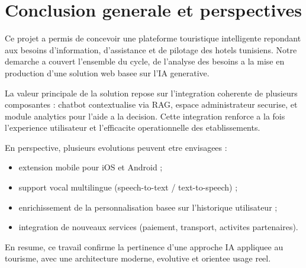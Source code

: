 \chapter*{Conclusion generale et perspectives}

Ce projet a permis de concevoir une plateforme touristique intelligente repondant aux besoins d'information, d'assistance et de pilotage des hotels tunisiens. Notre demarche a couvert l'ensemble du cycle, de l'analyse des besoins a la mise en production d'une solution web basee sur l'IA generative.

La valeur principale de la solution repose sur l'integration coherente de plusieurs composantes : chatbot contextualise via RAG, espace administrateur securise, et module analytics pour l'aide a la decision. Cette integration renforce a la fois l'experience utilisateur et l'efficacite operationnelle des etablissements.

En perspective, plusieurs evolutions peuvent etre envisagees :
\begin{itemize}
  \item extension mobile pour iOS et Android ;
  \item support vocal multilingue (speech-to-text / text-to-speech) ;
  \item enrichissement de la personnalisation basee sur l'historique utilisateur ;
  \item integration de nouveaux services (paiement, transport, activites partenaires).
\end{itemize}

En resume, ce travail confirme la pertinence d'une approche IA appliquee au tourisme, avec une architecture moderne, evolutive et orientee usage reel.
